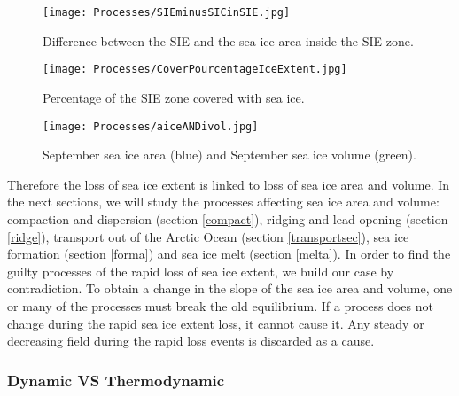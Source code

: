 \begin{figure}
\center
\noindent\texttt{[image: Processes/SIEminusSICinSIE.jpg]}
\caption{Difference between the SIE and the sea ice area inside the SIE zone.}
\end{figure}

\begin{figure}
\center
\noindent\texttt{[image: Processes/CoverPourcentageIceExtent.jpg]}
\caption{Percentage of the SIE zone covered with sea ice.}
\end{figure}

\begin{figure}
\center
\noindent\texttt{[image: Processes/aiceANDivol.jpg]}
\caption{September sea ice area (blue) and September sea ice volume (green).}
\end{figure}



Therefore the loss of sea ice extent is linked to loss of sea ice area and volume. In the next sections, we will study the processes affecting sea ice area and volume: compaction and dispersion (section \ref{compact}), ridging and lead opening (section \ref{ridge}), transport out of the Arctic Ocean (section \ref{transportsec}), sea ice formation (section \ref{forma}) and sea ice melt (section \ref{melta}). In order to find the guilty processes of the rapid loss of sea ice extent, we build our case by contradiction. To obtain a change in the slope of the sea ice area and volume, one or many of the processes must break the old equilibrium. If a process does not change during the rapid sea ice extent loss, it cannot cause it. Any steady or decreasing field during the rapid loss events is discarded as a cause. 





\subsubsection{Dynamic VS Thermodynamic}

